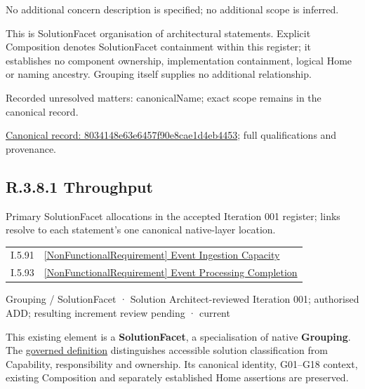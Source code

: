 No additional concern description is specified; no additional scope is inferred.



This is SolutionFacet organisation of architectural statements. Explicit Composition denotes SolutionFacet containment within this register; it establishes no component ownership, implementation containment, logical Home or naming ancestry. Grouping itself supplies no additional relationship.


{\small Recorded unresolved matters: canonicalName; exact scope remains in the canonical record.}\par
{\footnotesize \href{../../../../../../../continuum/grouping/8034148e63e6457f90e8cae1d4eb4453.md}{Canonical record: 8034148e63e6457f90e8cae1d4eb4453}; full qualifications and provenance.}\par
\subsection*{R.3.8.1 Throughput}
\label{navigation:R.3.8.1}

Primary SolutionFacet allocations in the accepted Iteration 001 register; links resolve to each statement’s one canonical native-layer location.\par
\begin{longtable}{p{.22\linewidth}p{.73\linewidth}}
I.5.91 & \hyperref[element:75420022c1a7463e91ca48f229a78194]{[NonFunctionalRequirement] Event Ingestion Capacity} \\
I.5.93 & \hyperref[element:d1380eec700a492b810354e0798c8146]{[NonFunctionalRequirement] Event Processing Completion} \\
\end{longtable}
\label{element:cdcfbe8d106844109bb8ded51dea7a8a}
{\small Grouping / SolutionFacet · Solution Architect-reviewed Iteration 001; authorised ADD; resulting increment review pending · current}\par

This existing element is a \textbf{SolutionFacet}, a specialisation of native
\textbf{Grouping}. The \href{\detokenize{../../../../../../../governance/continuum-representation.md#solutionfacet-classification--1119-candidate}}{governed definition}
distinguishes accessible solution classification from Capability, responsibility
and ownership. Its canonical identity, G01–G18 context, existing Composition
and separately established Home assertions are preserved.



